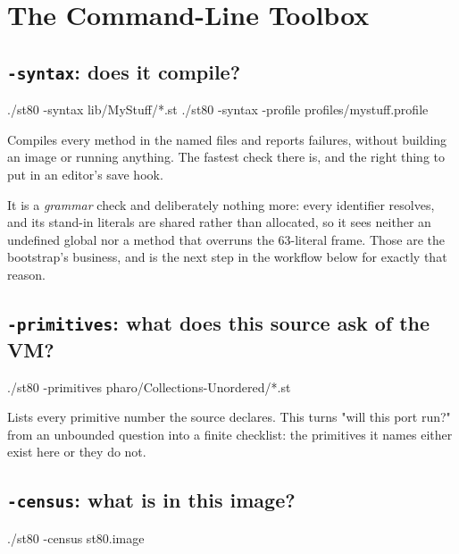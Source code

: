 \chapter{The Command-Line Toolbox}
\label{ch:toolbox}


\section{\texttt{-syntax}: does it compile?}

\begin{sh}
./st80 -syntax lib/MyStuff/*.st
./st80 -syntax -profile profiles/mystuff.profile
\end{sh}

Compiles every method in the named files and reports failures, without
building an image or running anything. The fastest check there is, and the
right thing to put in an editor's save hook.

It is a \emph{grammar} check and deliberately nothing more: every identifier
resolves, and its stand-in literals are shared rather than allocated, so it
sees neither an undefined global nor a method that overruns the 63-literal
frame. Those are the bootstrap's business, and  is the next step
in the workflow below for exactly that reason.

\section{\texttt{-primitives}: what does this source ask of the VM?}

\begin{sh}
./st80 -primitives pharo/Collections-Unordered/*.st
\end{sh}

Lists every primitive number the source declares. This turns "will this port
run?" from an unbounded question into a finite checklist: the primitives it
names either exist here or they do not.

\section{\texttt{-census}: what is in this image?}

\begin{sh}
./st80 -census st80.image
\end{sh}

